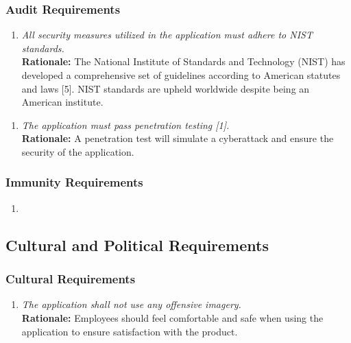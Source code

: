 \documentclass[]{article}
\begin{document}
\begin{enumerate}[{\bf BE1.}]
\subsubsection{Audit Requirements}
\label{ssub:audit_requirements}
\begin{enumerate}[{SR-AU}1. ]
    \item \emph{All security measures utilized in the application must adhere to NIST standards.}\\
    {\bf Rationale:} The National Institute of Standards and Technology (NIST) has developed a comprehensive set of guidelines according to American statutes and laws [5]. NIST standards are upheld worldwide despite being an American institute.
\end{enumerate}
\begin{enumerate}[{SR-AU}2. ]
    \item \emph{The application must pass penetration testing [1]. }\\
    {\bf Rationale:} A penetration test will simulate a cyberattack and ensure the security of the application.
\end{enumerate}


\subsubsection{Immunity Requirements}
\label{ssub:immunity_requirements}
\begin{enumerate}[{NA}]
    \item
\end{enumerate}




\subsection{Cultural and Political Requirements}
\label{sub:cultural_and_political_requirements}


\subsubsection{Cultural Requirements}
\label{ssub:cultural_requirements}
\begin{enumerate}[{CP-C}1. ]
    \item \emph{The application shall not use any offensive imagery.}\\
    {\bf Rationale:} Employees should feel comfortable and safe when using the application to ensure satisfaction with the product.
\end{enumerate}



\end{enumerate}
\end{document}
